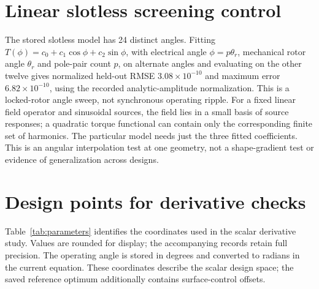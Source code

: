 \documentclass{anvil-paper}
\begin{document}
\appendix
\section{Linear slotless screening control}\label{sec:slotless}
The stored slotless model has 24 distinct angles. Fitting
$T(\phi)=c_0+c_1\cos\phi+c_2\sin\phi$, with electrical angle $\phi=p\theta_r$, mechanical rotor angle $\theta_r$
and pole-pair count $p$, on alternate angles and
evaluating on the other twelve gives normalized held-out RMSE
$3.08\times10^{-10}$ and maximum error $6.82\times10^{-10}$, using the
recorded analytic-amplitude normalization. This is a locked-rotor angle sweep,
not synchronous operating ripple. For a fixed linear field operator and
sinusoidal sources, the field lies in a small basis of source responses;
a quadratic torque functional can contain only the corresponding finite
set of harmonics. The particular model needs just the three fitted
coefficients. This is an angular interpolation test at one geometry,
not a shape-gradient test or evidence of generalization across designs.

\section{Design points for derivative checks}\label{sec:parameters}
Table~\ref{tab:parameters} identifies the coordinates used in the scalar
derivative study. Values are rounded for display; the accompanying records
retain full precision. The operating angle is stored in degrees and
converted to radians in the current equation. These coordinates describe
the scalar design space; the saved reference optimum additionally contains
surface-control offsets.
\begin{table}[H]\centering\small
\caption{Initial and interior perturbed design points for the derivative
checks. Lengths refer to the unscaled geometry.}\label{tab:parameters}

\end{table}



\end{document}
